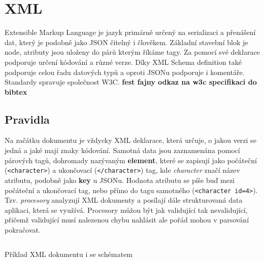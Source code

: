 \section{XML}
Extensible Markup Language je jazyk primárně určený na serializaci a přenášení dat, který je podobně jako JSON čitelný i člověkem. Základní stavební blok je node, atributy jsou uloženy do párů kterým říkáme tagy. Za pomocí své deklarace podporuje určení kódování a různé verze. Díky XML Schema definition také podporuje celou řadu datových typů a oproti JSONu podporuje i komentáře. Standardy spravuje společnost W3C. \textbf{fest fajny odkaz na w3c specifikaci do bibtex} %


\subsection{Pravidla}
Na začátku dokumentu je vždycky XML deklarace, která určuje, o jakou verzi se jedná a jaké mají znaky kódování.
Samotná data jsou zaznamenána pomocí párových tagů, dohromady nazývaným \textbf{element}, které se zapisují jako počáteční (\texttt{<character>}) a ukončovací (\texttt{</character>}) tag, kde \textit{character} značí název atributu, podobně jako \textbf{key} u JSONu. Hodnota atributu se píše buď mezi počáteční a ukončovací tag, nebo přímo do tagu samotného (\texttt{<character id=4>}). Tzv. \textit{procesory} analyzují XML dokumenty a posílají dále strukturovaná data aplikaci, která se využívá. Procesory můžou být jak validující tak nevalidující, přičemž validující musí nalezenou chybu nahlásit ale pořád mohou v parsování pokračovat.

\begin{listing}[H]
  \inputminted{xml}{resources/code/standards/player.xml}
  \caption{Příklad XML dokumentu i se schématem}
  \label{code:xml_player}
\end{listing}

